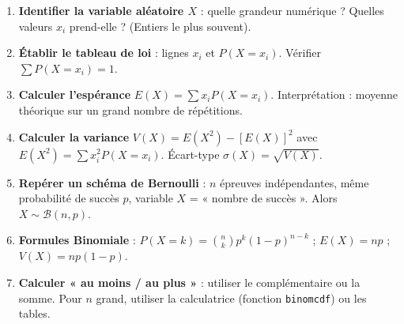 \documentclass[11pt]{article}
\begin{document}
\begin{methode}
    \begin{enumerate}
        \item \textbf{Identifier la variable aléatoire $X$} : quelle grandeur numérique ? Quelles valeurs $x_i$ prend-elle ? (Entiers le plus souvent).
        \item \textbf{Établir le tableau de loi} : lignes $x_i$ et $P(X=x_i)$. Vérifier $\sum P(X=x_i) = 1$.
        \item \textbf{Calculer l'espérance} $E(X) = \sum x_i P(X=x_i)$. Interprétation : moyenne théorique sur un grand nombre de répétitions.
        \item \textbf{Calculer la variance} $V(X) = E(X^2) - [E(X)]^2$ avec $E(X^2) = \sum x_i^2 P(X=x_i)$. Écart-type $\sigma(X) = \sqrt{V(X)}$.
        \item \textbf{Repérer un schéma de Bernoulli} : $n$ épreuves indépendantes, même probabilité de succès $p$, variable $X$ = « nombre de succès ». Alors $X \sim \mathcal{B}(n,p)$.
        \item \textbf{Formules Binomiale} : $P(X=k) = \binom{n}{k} p^k (1-p)^{n-k}$ ; $E(X)=np$ ; $V(X)=np(1-p)$.
        \item \textbf{Calculer « au moins / au plus »} : utiliser le complémentaire ou la somme. Pour $n$ grand, utiliser la calculatrice (fonction \texttt{binomcdf}) ou les tables.
    \end{enumerate}
\end{methode}
\end{document}
